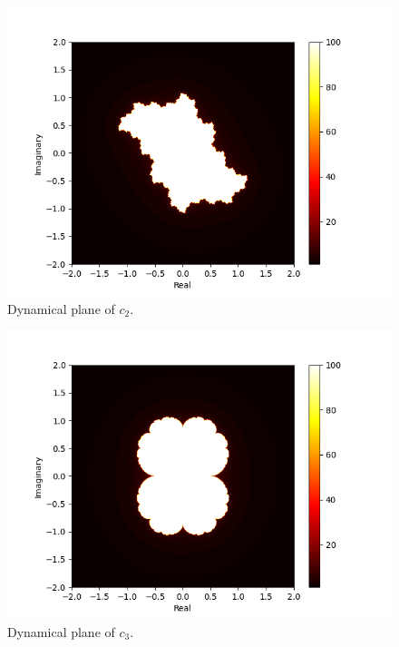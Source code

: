 \documentclass[11pt]{article}
\begin{document}
\begin{figure}[ht]
    \centering
    \includegraphics{julia_set_0.0_-0.5.png}
    \caption{Dynamical plane of $c_2$.}
    \label{fig:1c}
\end{figure}
\begin{figure}[ht]
    \centering
    \includegraphics{julia_set_0.25_0.0.png}
    \caption{Dynamical plane of $c_3$.}
    \label{fig:1d}
\end{figure}
\end{document}

